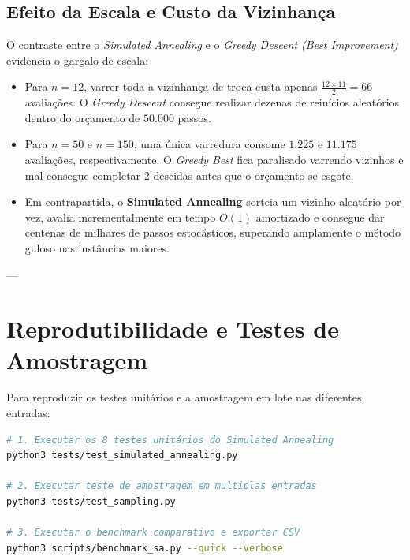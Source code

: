 \documentclass[11pt,a4paper]{article}
\begin{document}
\subsection{Efeito da Escala e Custo da Vizinhança}
O contraste entre o \textit{Simulated Annealing} e o \textit{Greedy Descent (Best Improvement)} evidencia o gargalo de escala:
\begin{itemize}
    \item Para $n=12$, varrer toda a vizinhança de troca custa apenas $\frac{12 \times 11}{2} = 66$ avaliações. O \textit{Greedy Descent} consegue realizar dezenas de reinícios aleatórios dentro do orçamento de $50.000$ passos.
    \item Para $n=50$ e $n=150$, uma única varredura consome $1.225$ e $11.175$ avaliações, respectivamente. O \textit{Greedy Best} fica paralisado varrendo vizinhos e mal consegue completar 2 descidas antes que o orçamento se esgote.
    \item Em contrapartida, o \textbf{Simulated Annealing} sorteia um vizinho aleatório por vez, avalia incrementalmente em tempo $O(1)$ amortizado e consegue dar centenas de milhares de passos estocásticos, superando amplamente o método guloso nas instâncias maiores.
\end{itemize}

---

\section{Reprodutibilidade e Testes de Amostragem}

Para reproduzir os testes unitários e a amostragem em lote nas diferentes entradas:
\begin{lstlisting}[language=bash]
# 1. Executar os 8 testes unitários do Simulated Annealing
python3 tests/test_simulated_annealing.py

# 2. Executar teste de amostragem em multiplas entradas
python3 tests/test_sampling.py

# 3. Executar o benchmark comparativo e exportar CSV
python3 scripts/benchmark_sa.py --quick --verbose
\end{lstlisting}
\end{document}
